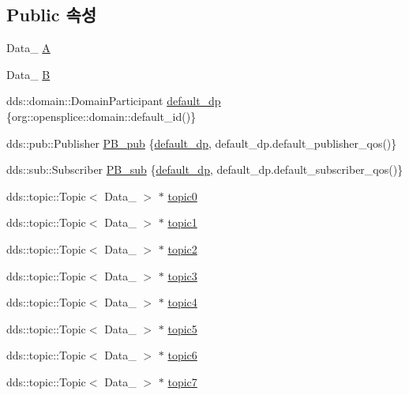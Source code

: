 \subsection*{Public 속성}
\begin{DoxyCompactItemize}
\item 
Data\+\_ \hyperlink{classProcessingBlock_a25b19325d824b725a2763f223c3270a4}{A}
\item 
Data\+\_ \hyperlink{classProcessingBlock_a4d2343458c1ebfd02d744661f2898a42}{B}
\item 
dds\+::domain\+::\+Domain\+Participant \hyperlink{classProcessingBlock_ac7fe933d16fd30553840dfe2febfe3eb}{default\+\_\+dp} \{org\+::opensplice\+::domain\+::default\+\_\+id()\}
\item 
dds\+::pub\+::\+Publisher \hyperlink{classProcessingBlock_aed99bbdd5010b92144f60073869e5589}{P\+B\+\_\+pub} \{\hyperlink{classProcessingBlock_ac7fe933d16fd30553840dfe2febfe3eb}{default\+\_\+dp}, default\+\_\+dp.\+default\+\_\+publisher\+\_\+qos()\}
\item 
dds\+::sub\+::\+Subscriber \hyperlink{classProcessingBlock_a8ec9ebfda53e78f78a14df60ac1cc4fd}{P\+B\+\_\+sub} \{\hyperlink{classProcessingBlock_ac7fe933d16fd30553840dfe2febfe3eb}{default\+\_\+dp}, default\+\_\+dp.\+default\+\_\+subscriber\+\_\+qos()\}
\item 
dds\+::topic\+::\+Topic$<$ Data\+\_ $>$ $\ast$ \hyperlink{classProcessingBlock_a0f1a760ea62759051759def67ecb71b2}{topic0}
\item 
dds\+::topic\+::\+Topic$<$ Data\+\_ $>$ $\ast$ \hyperlink{classProcessingBlock_abd3ca285d8e6231566b7a9b7e2a9f386}{topic1}
\item 
dds\+::topic\+::\+Topic$<$ Data\+\_ $>$ $\ast$ \hyperlink{classProcessingBlock_a404e2a175190e51bd9342b21736c08a3}{topic2}
\item 
dds\+::topic\+::\+Topic$<$ Data\+\_ $>$ $\ast$ \hyperlink{classProcessingBlock_a3549c6ba84ea050b6da2c5512543ee27}{topic3}
\item 
dds\+::topic\+::\+Topic$<$ Data\+\_ $>$ $\ast$ \hyperlink{classProcessingBlock_ad87250e1db0e762ef533c5c42a0d664f}{topic4}
\item 
dds\+::topic\+::\+Topic$<$ Data\+\_ $>$ $\ast$ \hyperlink{classProcessingBlock_a8d76712e54b3d59cad11c796680d0ef2}{topic5}
\item 
dds\+::topic\+::\+Topic$<$ Data\+\_ $>$ $\ast$ \hyperlink{classProcessingBlock_a5e0dba92ddf83623776beb095de4b960}{topic6}
\item 
dds\+::topic\+::\+Topic$<$ Data\+\_ $>$ $\ast$ \hyperlink{classProcessingBlock_aab1d9e5c6c530db34a95af444f81ad4b}{topic7}

\end{DoxyCompactItemize}
